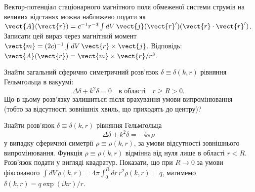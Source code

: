 \begin{problem}%
Вектор-потенціал стаціонарного магнітного поля обмеженої системи струмів на великих відстанях можна наближено подати як \( \vect{A}(\vect{r}) =
c^{-1} r^{-3} \int dV \, \vect{j}(\vect{r}')(\vect{r} \cdot \vect{r}') \). Записати цей вираз через магнітний момент \( \vect{m} = (2c)^{-1} \int dV \,
\vect{r} \times \vect{j} \). Відповідь: \( \vect{A}(\vect{r}) = \vect{m} \times \vect{r} / r^3 \).
\end{problem}


\begin{problem}%
Знайти загальний сферично симетричний розв’язок \( \delta \equiv \delta(k, r) \) рівняння Гельмгольца в вакуумі:
\[
\Delta \delta + k^2 \delta = 0 \quad \text{в області} \quad r \geq R > 0.
\]
Що в цьому розв’язку залишиться після врахування умови випромінювання (тобто за відсутності зовнішніх хвиль, що приходять до центру)?
\end{problem}

\begin{problem}%
Знайти розв’язок \( \delta \equiv \delta(k, r) \) рівняння Гельмгольца
\begin{equation*}
   \Delta \delta + k^2 \delta = -4\pi\rho
\end{equation*}
у випадку сферичної симетрії \(
\rho \equiv \rho(k, r) \), за умови відсутності зовнішнього випромінювання. Функція \( \rho \equiv \rho(k, r) \) відмінна від нуля лише в області \( r <
R \). Розв’язок подати у вигляді квадратур. Показати, що при \( R \to 0 \) за умови фіксованого \( \int dV \, \rho(k, r) = 4\pi \int_0^R dr \, r^2
\rho(k, r) = q \), матимемо \( \delta(k, r) = q \exp(ikr) / r \).
\end{problem}

